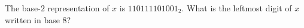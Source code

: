The base-$2$ representation of $x$ is $110111101001_2$. What is the leftmost digit of $x$ written in base $8$?
